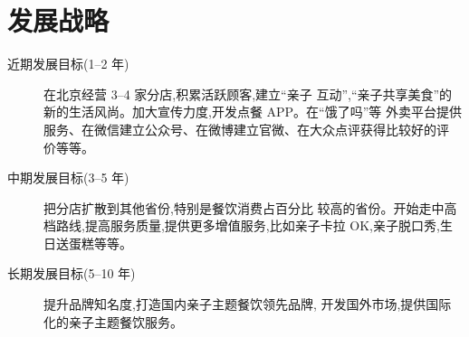 \section{发展战略}
\begin{description}
\item [近期发展目标(1--2 年)] 在北京经营 3--4 家分店,积累活跃顾客,建立“亲子
互动”,“亲子共享美食”的新的生活风尚。加大宣传力度,开发点餐 APP。在“饿了吗”等
外卖平台提供服务、在微信建立公众号、在微博建立官微、在大众点评获得比较好的评
价等等。

\item [中期发展目标(3--5 年)] 把分店扩散到其他省份,特别是餐饮消费占百分比
较高的省份。开始走中高档路线,提高服务质量,提供更多增值服务,比如亲子卡拉
OK,亲子脱口秀,生日送蛋糕等等。

\item [ 长期发展目标(5--10 年)] 提升品牌知名度,打造国内亲子主题餐饮领先品牌,
开发国外市场,提供国际化的亲子主题餐饮服务。
\end{description}
